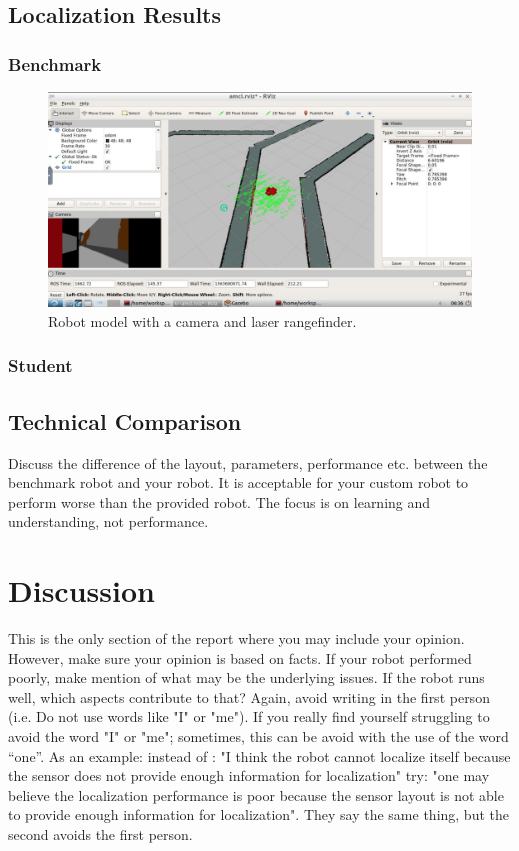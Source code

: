 \documentclass[10pt,journal,compsoc]{IEEEtran}
\begin{document}
\subsection{Localization Results}
\subsubsection{Benchmark}
\begin{figure}[thpb]
      \centering
      \includegraphics[width=\linewidth]{acml.png}
      \caption{Robot model with a camera and laser rangefinder.}
      \label{fig:robot1}
\end{figure}
\subsubsection{Student}

\subsection{Technical Comparison} %
Discuss the difference of the layout, parameters, performance etc. between the benchmark robot and your robot. It is acceptable for your custom robot to perform worse than the provided robot. The focus is on learning and understanding, not performance. 

\section{Discussion}
This is the only section of the report where you may include your opinion. However, make sure your opinion is based on facts. If your robot performed poorly, make mention of what may be the underlying issues. If the robot runs well, which aspects contribute to that? Again, avoid writing in the first person (i.e. Do not use words like "I" or "me"). If you really find yourself struggling to avoid the word "I" or "me"; sometimes, this can be avoid with the use of the word “one”. As an example: instead of : "I think the robot cannot localize itself because the sensor does not provide enough information for localization" try: "one may believe the localization performance is poor because the sensor layout is not able to provide enough information for localization". They say the same thing, but the second avoids the first person. 
\end{document}

